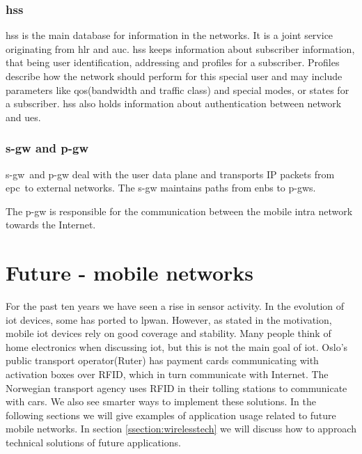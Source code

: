 \documentclass[USenglish]{ifimaster}  %
\begin{document}
\subsubsection{\acrshort{hss}}
\acrfull{hss} is the main database for information in the networks. It is a joint service originating from \acrfull{hlr} and \acrfull{auc}. \acrshort{hss} keeps information about subscriber information, that being user identification, addressing and profiles for a subscriber. Profiles describe how the network should perform for this special user and may include parameters like \acrshort{qos}(bandwidth and traffic class) and special modes, or states for a subscriber.
\newline
\acrshort{hss} also holds information about authentication between network and \acrshort{ue}s.

\subsubsection{\acrshort{s-gw} and \acrshort{p-gw}}
\acrfull{s-gw} and \acrfull{p-gw} deal with the user data plane and transports IP packets from \acrshort{epc} to external networks. The \acrshort{s-gw} maintains paths from \acrshort{enb}s to \acrshort{p-gw}s.

The \acrshort{p-gw} is responsible for the communication between the mobile intra network towards the Internet.

\section{Future - mobile networks} \label{section:futureapplications}
For the past ten years we have seen a rise in sensor activity. In the evolution of \acrshort{iot} devices, some has ported to \acrshort{lpwan}. However, as stated in the motivation, mobile \acrshort{iot} devices rely on good coverage and stability. Many people think of home electronics when discussing \acrshort{iot}, but this is not the main goal of \acrshort{iot}. Oslo's public transport operator(Ruter) has payment cards communicating with activation boxes over RFID, which in turn communicate with Internet. The Norwegian transport agency uses RFID in their tolling stations to communicate with cars. We also see smarter ways to implement these solutions. In the following sections we will give examples of application usage related to future mobile networks. In section \vref{ssection:wirelesstech} we will discuss how to approach technical solutions of future applications.
\end{document}
